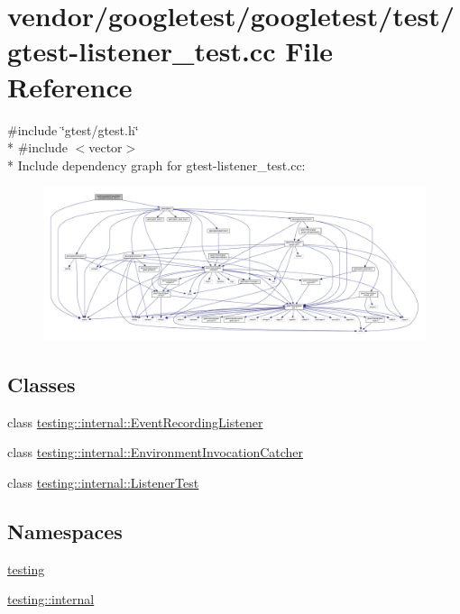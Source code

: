 \hypertarget{gtest-listener__test_8cc}{}\section{vendor/googletest/googletest/test/gtest-\/listener\+\_\+test.cc File Reference}
\label{gtest-listener__test_8cc}
{\ttfamily \#include \char`\"{}gtest/gtest.\+h\char`\"{}}\\*
{\ttfamily \#include $<$vector$>$}\\*
Include dependency graph for gtest-\/listener\+\_\+test.cc\+:\nopagebreak
\begin{figure}[H]
\begin{center}
\leavevmode
\includegraphics[width=350pt]{gtest-listener__test_8cc__incl}
\end{center}
\end{figure}
\subsection*{Classes}
\begin{DoxyCompactItemize}
\item 
class \hyperlink{classtesting_1_1internal_1_1EventRecordingListener}{testing\+::internal\+::\+Event\+Recording\+Listener}
\item 
class \hyperlink{classtesting_1_1internal_1_1EnvironmentInvocationCatcher}{testing\+::internal\+::\+Environment\+Invocation\+Catcher}
\item 
class \hyperlink{classtesting_1_1internal_1_1ListenerTest}{testing\+::internal\+::\+Listener\+Test}
\end{DoxyCompactItemize}
\subsection*{Namespaces}
\begin{DoxyCompactItemize}
\item 
 \hyperlink{namespacetesting}{testing}
\item 
 \hyperlink{namespacetesting_1_1internal}{testing\+::internal}
\end{DoxyCompactItemize}
